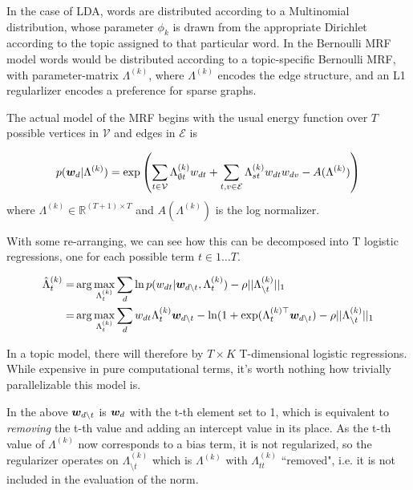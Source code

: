 In the case of LDA, words are distributed according to a Multinomial distribution, whose parameter $\phi_k$ is drawn from the appropriate Dirichlet according to the topic assigned to that particular word. In the Bernoulli MRF model words would be distributed according to a topic-specific Bernoulli MRF, with parameter-matrix $\Lambda^{(k)}$, where $\Lambda^{(k)}$ encodes the edge structure, and an L1 regularlizer encodes a preference for sparse graphs.

\newcommand \vertices { { \mathcal{V} } }
\newcommand \edges    { { \mathcal{E} } }

The actual model of the MRF begins with the usual energy function over $T$ possible vertices in $\vertices$ and edges in $\edges$ is

\begin{equation}
p(\vv{w}_d|\Lambda^{(k)}) = \exp\left(
    \sum_{t\in\vertices}\Lambda^{(k)}_{\emptyset t} w_{dt}
    + \sum_{t,v \in \edges}\Lambda^{(k)}_{st} w_{dt} w_{dv}
    - A(\Lambda^{(k)})
\right)
\end{equation}
where $\Lambda^{(k)} \in \mathbb{R}^{(T+1) \times T}$ and $A(\Lambda^{(k)})$ is the log normalizer. 

With some re-arranging, we can see how this can be decomposed into T logistic regressions, one for each possible term $t \in {1\ldots T}$. 

\begin{align}
\hat{\Lambda}^{(k)}_t = & \arg \max_{\Lambda^{(k)}_t} \sum_d \ln p(w_{dt}|\bm w_{d \setminus t}, \Lambda^{(k)}_t) - \rho ||\Lambda^{(k)}_{\setminus t}||_1 \\
 = &  \arg \max_{\Lambda^{(k)}_t} \sum_d w_{dt} \Lambda^{(k)}_t \bm w_{d \setminus t} - \ln(1 + \exp(\Lambda_t^{(k)\top}\bm w_{d \setminus t}) - \rho ||\Lambda^{(k)}_{\setminus t}||_1
\end{align}

In a topic model, there will therefore by $T \times K$ T-dimensional logistic regressions. While expensive in pure computational terms, it's worth nothing how trivially parallelizable this model is.

In the above $\bm w_{d \setminus t}$ is $\bm w_d$ with the t-th element set to 1, which is equivalent to \emph{removing} the t-th value and adding an intercept value in its place. As the t-th value of $\Lambda^{(k)}$ now corresponds to a bias term, it is not regularized, so the regularizer operates on $\Lambda^{(k)}_{\setminus t}$ which is $\Lambda^{(k)}$ with $\Lambda^{(k)}_{tt}$ ``removed", i.e. it is not included in the evaluation of the norm.

